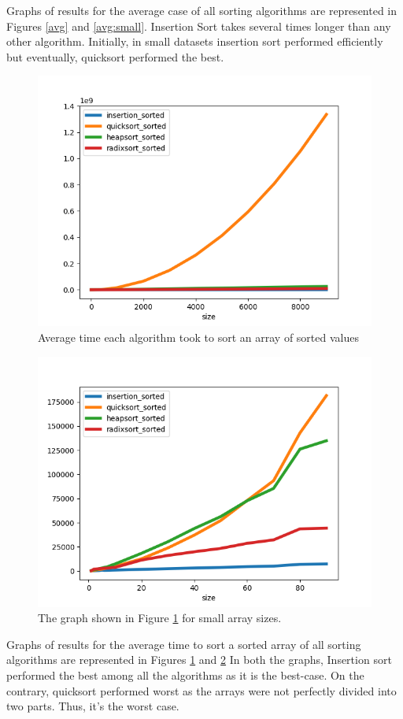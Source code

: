 \documentclass{article}
\begin{document}
Graphs of results for the average case of all sorting algorithms are represented in Figures \ref{avg} and \ref{avg:small}.
Insertion Sort takes several times longer than any other algorithm.
Initially, in small datasets insertion sort performed efficiently but eventually, quicksort performed the best.

\begin{figure}[ht]
\centering
\includegraphics[width=0.8\linewidth,height=0.4\textheight]{plt2.png}
\caption{Average time each algorithm took to sort an array of sorted values }
\label{best}
\end{figure}

\begin{figure}[ht]
\centering
\includegraphics[width=0.8\linewidth,height=0.4\textheight]{plt6.png}
\caption{The graph shown in Figure \ref{best} for small array sizes.}
\label{best:small}
\end{figure}

Graphs of results for the average time to sort a sorted array of all sorting algorithms are represented in Figures \ref{best} and \ref{best:small}
In both the graphs, Insertion sort performed the best among all the algorithms as it is the best-case. On the contrary, quicksort performed worst as the arrays were not perfectly divided into two parts. Thus, it's the worst case. 
\end{document}
